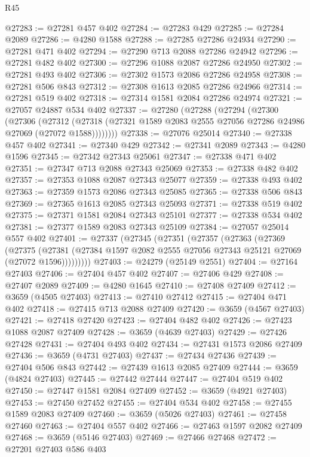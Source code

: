 \begin{lexlean}{R45}
\begin{coremodule}
@27283 := @27281 @457 @402
@27284 := @27283 @429
@27285 := @27284 @2089
@27286 := @4280 @1588
@27288 := @27285 @27286 @24934
@27290 := @27281 @471 @402
@27294 := @27290 @713 @2088 @27286 @24942
@27296 := @27281 @482 @402
@27300 := @27296 @1088 @2087 @27286 @24950
@27302 := @27281 @493 @402
@27306 := @27302 @1573 @2086 @27286 @24958
@27308 := @27281 @506 @843
@27312 := @27308 @1613 @2085 @27286 @24966
@27314 := @27281 @519 @402
@27318 := @27314 @1581 @2084 @27286 @24974
@27321 := @27057 @24887 @534 @402
@27337 := @27280
    (@27288
      (@27294
        (@27300
          (@27306
            (@27312
              (@27318 (@27321 @1589 @2083 @2555 @27056 @27286 @24986 @27069 (@27072 @1588))))))))
@27338 := @27076 @25014
@27340 := @27338 @457 @402
@27341 := @27340 @429
@27342 := @27341 @2089
@27343 := @4280 @1596
@27345 := @27342 @27343 @25061
@27347 := @27338 @471 @402
@27351 := @27347 @713 @2088 @27343 @25069
@27353 := @27338 @482 @402
@27357 := @27353 @1088 @2087 @27343 @25077
@27359 := @27338 @493 @402
@27363 := @27359 @1573 @2086 @27343 @25085
@27365 := @27338 @506 @843
@27369 := @27365 @1613 @2085 @27343 @25093
@27371 := @27338 @519 @402
@27375 := @27371 @1581 @2084 @27343 @25101
@27377 := @27338 @534 @402
@27381 := @27377 @1589 @2083 @27343 @25109
@27384 := @27057 @25014 @557 @402
@27401 := @27337
    (@27345
      (@27351
        (@27357
          (@27363
            (@27369
              (@27375
                (@27381 (@27384 @1597 @2082 @2555 @27056 @27343 @25121 @27069 (@27072 @1596)))))))))
@27403 := @24279 (@25149 @2551)
@27404 := @27164 @27403
@27406 := @27404 @457 @402
@27407 := @27406 @429
@27408 := @27407 @2089
@27409 := @4280 @1645
@27410 := @27408 @27409
@27412 := @3659 (@4505 @27403)
@27413 := @27410 @27412
@27415 := @27404 @471 @402
@27418 := @27415 @713 @2088 @27409
@27420 := @3659 (@4567 @27403)
@27421 := @27418 @27420
@27423 := @27404 @482 @402
@27426 := @27423 @1088 @2087 @27409
@27428 := @3659 (@4639 @27403)
@27429 := @27426 @27428
@27431 := @27404 @493 @402
@27434 := @27431 @1573 @2086 @27409
@27436 := @3659 (@4731 @27403)
@27437 := @27434 @27436
@27439 := @27404 @506 @843
@27442 := @27439 @1613 @2085 @27409
@27444 := @3659 (@4824 @27403)
@27445 := @27442 @27444
@27447 := @27404 @519 @402
@27450 := @27447 @1581 @2084 @27409
@27452 := @3659 (@4921 @27403)
@27453 := @27450 @27452
@27455 := @27404 @534 @402
@27458 := @27455 @1589 @2083 @27409
@27460 := @3659 (@5026 @27403)
@27461 := @27458 @27460
@27463 := @27404 @557 @402
@27466 := @27463 @1597 @2082 @27409
@27468 := @3659 (@5146 @27403)
@27469 := @27466 @27468
@27472 := @27201 @27403 @586 @403

\end{coremodule}
\end{lexlean}
